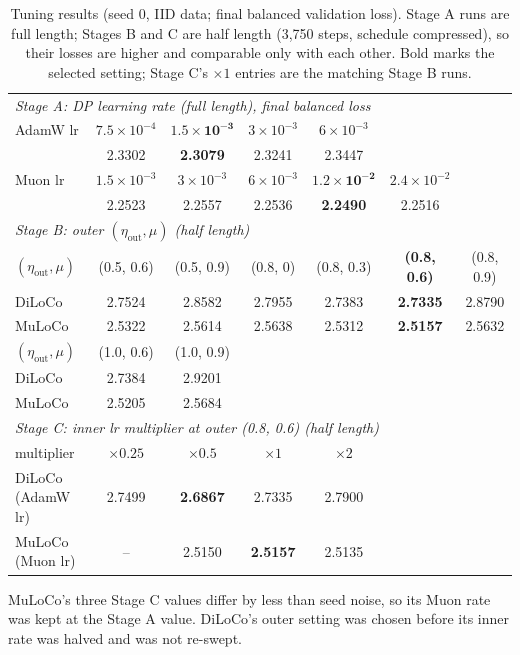 \documentclass{article}
\begin{document}
\begin{table}[!htbp]
  \centering
  \small
  \caption{Tuning results (seed 0, IID data; final balanced validation loss). Stage A runs are full length; Stages B and C are half length (3{,}750 steps, schedule compressed), so their losses are higher and comparable only with each other. Bold marks the selected setting; Stage C's $\times1$ entries are the matching Stage B runs.}
  \label{tab:tuning}
  \begin{tabular}{lcccccc}
    \toprule
    \multicolumn{7}{l}{\emph{Stage A: DP learning rate (full length), final balanced loss}} \\
    AdamW lr & $7.5\times10^{-4}$ & $\mathbf{1.5\times10^{-3}}$ & $3\times10^{-3}$ & $6\times10^{-3}$ & & \\
     & 2.3302 & \textbf{2.3079} & 2.3241 & 2.3447 & & \\
    Muon lr & $1.5\times10^{-3}$ & $3\times10^{-3}$ & $6\times10^{-3}$ & $\mathbf{1.2\times10^{-2}}$ & $2.4\times10^{-2}$ & \\
     & 2.2523 & 2.2557 & 2.2536 & \textbf{2.2490} & 2.2516 & \\
    \midrule
    \multicolumn{7}{l}{\emph{Stage B: outer $(\eta_{\mathrm{out}}, \mu)$ (half length)}} \\
    $(\eta_{\mathrm{out}}, \mu)$ & (0.5, 0.6) & (0.5, 0.9) & (0.8, 0) & (0.8, 0.3) & \textbf{(0.8, 0.6)} & (0.8, 0.9) \\
    DiLoCo & 2.7524 & 2.8582 & 2.7955 & 2.7383 & \textbf{2.7335} & 2.8790 \\
    MuLoCo & 2.5322 & 2.5614 & 2.5638 & 2.5312 & \textbf{2.5157} & 2.5632 \\
    $(\eta_{\mathrm{out}}, \mu)$ & (1.0, 0.6) & (1.0, 0.9) & & & & \\
    DiLoCo & 2.7384 & 2.9201 & & & & \\
    MuLoCo & 2.5205 & 2.5684 & & & & \\
    \midrule
    \multicolumn{7}{l}{\emph{Stage C: inner lr multiplier at outer (0.8, 0.6) (half length)}} \\
    multiplier & $\times0.25$ & $\times0.5$ & $\times1$ & $\times2$ & & \\
    DiLoCo (AdamW lr) & 2.7499 & \textbf{2.6867} & 2.7335 & 2.7900 & & \\
    MuLoCo (Muon lr) & -- & 2.5150 & \textbf{2.5157} & 2.5135 & & \\
    \bottomrule
  \end{tabular}
\end{table}
MuLoCo's three Stage C values differ by less than seed noise, so its Muon rate was kept at the Stage A value. DiLoCo's
outer setting was chosen before its inner rate was halved and was not re-swept.
\end{document}
